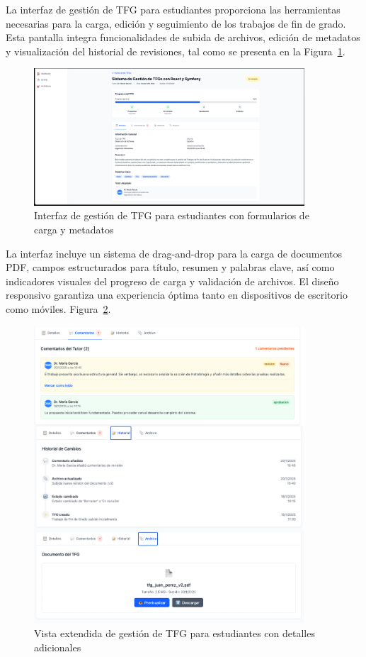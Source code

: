 \documentclass[12pt,a4paper,oneside]{report}
\begin{document}
La interfaz de gestión de TFG para estudiantes proporciona las herramientas necesarias para la carga, edición y seguimiento de los trabajos de fin de grado. Esta pantalla integra funcionalidades de subida de archivos, edición de metadatos y visualización del historial de revisiones, tal como se presenta en la Figura~\ref{fig:gestion-tfg-estudiante}.

\begin{figure}[H]
\centering
\includegraphics[width=0.9\textwidth]{processed/images/gestion_tfg_estudiante.png}
\caption{Interfaz de gestión de TFG para estudiantes con formularios de carga y metadatos}
\label{fig:gestion-tfg-estudiante}
\end{figure}

La interfaz incluye un sistema de drag-and-drop para la carga de documentos PDF, campos estructurados para título, resumen y palabras clave, así como indicadores visuales del progreso de carga y validación de archivos. El diseño responsivo garantiza una experiencia óptima tanto en dispositivos de escritorio como móviles. Figura~\ref{fig:tfg-estudiante-extendido}.

\begin{figure}[H]
\centering
\includegraphics[width=0.9\textwidth]{processed/images/tfg-estudiante-extendido.png}
\caption{Vista extendida de gestión de TFG para estudiantes con detalles adicionales}
\label{fig:tfg-estudiante-extendido}
\end{figure}
\end{document}
